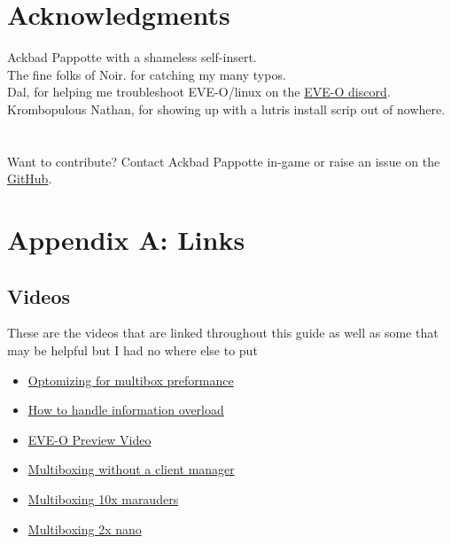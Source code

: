 \documentclass{article}
\begin{document}
\clearpage
\section{Acknowledgments}
Ackbad Pappotte with a shameless self-insert.\\
The fine folks of Noir. for catching my many typos.\\
Dal, for helping me troubleshoot EVE-O/linux on the \href{https://discord.gg/xYt8R9AFXB}{EVE-O discord}. \\
Krombopulous Nathan, for showing up with a lutris install scrip out of nowhere. \\
\\
\\
Want to contribute? Contact Ackbad Pappotte in-game or raise an issue on the \href{https://github.com/AckbadP/eve-multi-guide}{GitHub}.  
\\

\clearpage
\section*{Appendix A: Links}
\subsection*{Videos}
These are the videos that are linked throughout this guide as well as some that may be helpful but I had no where else to put
\begin{itemize}
  \item \href{https://www.youtube.com/watch?v=dKbQezW0ZwU}{Optomizing for multibox preformance}
  \item \href{https://www.youtube.com/watch?v=Lm4tVwSkBiE}{How to handle information overload}
  \item \href{https://www.youtube.com/watch?v=UpQpgcKSCS4}{EVE-O Preview Video}
  \item \href{https://www.youtube.com/watch?v=xpiYxq3mpD8}{Multiboxing without a client manager}
  \item \href{https://www.youtube.com/watch?v=iC8PwaFf8ck}{Multiboxing 10x marauders}
  \item \href{https://www.youtube.com/watch?v=p5WXd2IkaOc}{Multiboxing 2x nano}
\end{itemize}
\end{document}
